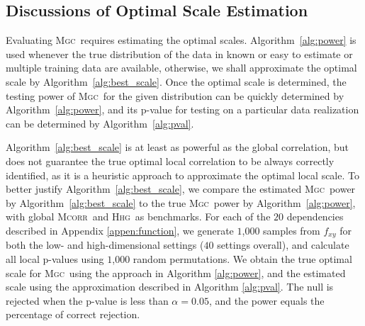 \documentclass[11pt]{article}
\providecommand{\sct}[1]{{\normalfont\textsc{#1}}}
\newcommand{\Mgc}{\sct{Mgc}}
\newcommand{\Hhg}{\sct{Hhg}}
\newcommand{\Mcorr}{\sct{Mcorr}}
\begin{document}
\clearpage
\subsection{Discussions of Optimal Scale Estimation}
\label{appen:diss}
Evaluating \Mgc~requires estimating the optimal scales. Algorithm~\ref{alg:power} is used whenever the true distribution of the data in known or easy to estimate or multiple training data are available, otherwise, we shall approximate the optimal scale by Algorithm~\ref{alg:best_scale}. Once the optimal scale is determined, the testing power of \Mgc~for the given distribution can be quickly determined by Algorithm~\ref{alg:power}, and its p-value for testing on a particular data realization can be determined by Algorithm~\ref{alg:pval}.


Algorithm~\ref{alg:best_scale} is at least as powerful as the global correlation, but does not guarantee the true optimal local correlation to be always correctly identified, as it is a heuristic approach to approximate the optimal local scale. To better justify Algorithm~\ref{alg:best_scale}, we compare the estimated \Mgc~power by Algorithm~\ref{alg:best_scale} to the true \Mgc~power by Algorithm~\ref{alg:power}, with  global \Mcorr~and \Hhg~as benchmarks. For each of the $20$ dependencies described in Appendix \ref{appen:function}, we generate $1$,$000$ samples from $f_{xy}$ for both the low- and high-dimensional settings ($40$ settings overall), and calculate all local p-values using $1$,$000$ random permutations. 
We obtain the true optimal scale for \Mgc~using the approach in Algorithm \ref{alg:power}, and the estimated scale using the approximation described in Algorithm \ref{alg:pval}.  
The null is rejected when the p-value is less than $\alpha=0.05$, and the power equals the percentage of correct rejection. 
\end{document}
